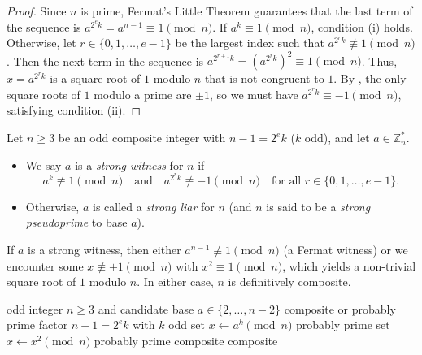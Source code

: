 \begin{proof}
    Since \(n\) is prime, Fermat's Little Theorem guarantees that the last term of the sequence is \(a^{2^e k} = a^{n-1} \equiv 1 \pmod{n}\).
    If \(a^k \equiv 1 \pmod{n}\), condition (i) holds.
    Otherwise, let \(r \in \{0, 1, \dots, e-1\}\) be the largest index such that \(a^{2^r k} \not\equiv 1 \pmod{n}\).
    Then the next term in the sequence is \(a^{2^{r+1} k} = (a^{2^r k})^2 \equiv 1 \pmod{n}\).
    Thus, \(x = a^{2^r k}\) is a square root of \(1\) modulo \(n\) that is not congruent to \(1\).
    By , the only square roots of \(1\) modulo a prime are \(\pm 1\), so we must have \(a^{2^r k} \equiv -1 \pmod{n}\), satisfying condition (ii).
\end{proof}

\begin{definition}
    Let \(n \geq 3\) be an odd composite integer with \(n - 1 = 2^e k\) (\(k\) odd), and let \(a \in \mathbb{Z}_n^*\).
    \begin{itemize}
        \item We say \(a\) is a \emph{strong witness} for \(n\) if
        \[
            a^k \not\equiv 1 \pmod{n} \quad \text{and} \quad a^{2^r k} \not\equiv -1 \pmod{n} \quad \text{for all } r \in \{0, 1, \dots, e - 1\}.
        \]
        \item Otherwise, \(a\) is called a \emph{strong liar} for \(n\) (and \(n\) is said to be a \emph{strong pseudoprime} to base \(a\)).
    \end{itemize}
\end{definition}

If \(a\) is a strong witness, then either \(a^{n-1} \not\equiv 1 \pmod{n}\) (a Fermat witness) or we encounter some \(x \not\equiv \pm 1 \pmod{n}\) with \(x^2 \equiv 1 \pmod{n}\), which yields a non-trivial square root of \(1\) modulo \(n\).
In either case, \(n\) is definitively composite.

\begin{algorithm}[htbp]
    \caption{Miller--Rabin Primality Test}\label{alg:miller-rabin}
    \begin{algorithmic}[1]
        \Input odd integer \(n \geq 3\) and candidate base \(a \in \{2, \dots, n-2\}\)
        \Output \textup{composite} or \textup{probably prime}
        \State factor \(n - 1 = 2^e k\) with \(k\) odd
        \State set \(x \gets a^k \pmod{n}\)
            \State \Return \textup{probably prime} 
        \EndIf
            \State set \(x \gets x^2 \pmod{n}\)
                \State \Return \textup{probably prime} 
            \EndIf
                \State \Return \textup{composite} 
            \EndIf
        \EndFor
        \State \Return \textup{composite} 
    \end{algorithmic}
\end{algorithm}

